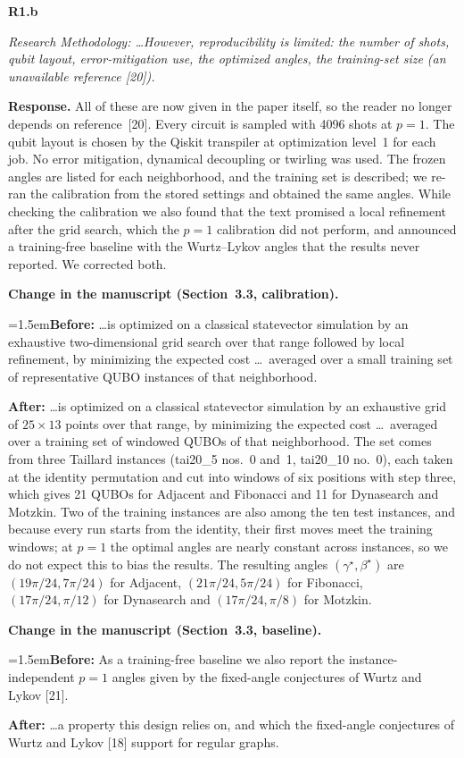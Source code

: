 \documentclass[11pt]{article}
\newenvironment{rc}[1]{\par\medskip\noindent\textbf{#1}\par\nopagebreak\noindent\itshape\ignorespaces}{\par}
\newcommand{\answer}[1]{\par\smallskip\noindent\textbf{Response.} #1\par}
\newcommand{\change}[3]{\par\smallskip\noindent\textbf{Change in the manuscript (#1).}\par
  {\leftskip=1.5em\noindent\textbf{Before:} #2\par\noindent\textbf{After:} #3\par}}
\begin{document}
\begin{rc}{R1.b}
Research Methodology: \ldots However, reproducibility is limited: the number of shots, qubit layout, error-mitigation use, the optimized angles, the training-set size (an unavailable reference [20]).
\end{rc}
\answer{All of these are now given in the paper itself, so the reader no longer depends on reference~[20]. Every circuit is sampled with 4096 shots at $p=1$. The qubit layout is chosen by the Qiskit transpiler at optimization level~1 for each job. No error mitigation, dynamical decoupling or twirling was used. The frozen angles are listed for each neighborhood, and the training set is described; we re-ran the calibration from the stored settings and obtained the same angles. While checking the calibration we also found that the text promised a local refinement after the grid search, which the $p=1$ calibration did not perform, and announced a training-free baseline with the Wurtz--Lykov angles that the results never reported. We corrected both.}
\change{Section~3.3, calibration}{\ldots is optimized on a classical statevector simulation by an exhaustive two-dimensional grid search over that range followed by local refinement, by minimizing the expected cost \ldots\ averaged over a small training set of representative QUBO instances of that neighborhood.}{\ldots is optimized on a classical statevector simulation by an exhaustive grid of $25\times13$ points over that range, by minimizing the expected cost \ldots\ averaged over a training set of windowed QUBOs of that neighborhood. The set comes from three Taillard instances (tai20\_5 nos.~0 and~1, tai20\_10 no.~0), each taken at the identity permutation and cut into windows of six positions with step three, which gives 21 QUBOs for Adjacent and Fibonacci and 11 for Dynasearch and Motzkin. Two of the training instances are also among the ten test instances, and because every run starts from the identity, their first moves meet the training windows; at $p=1$ the optimal angles are nearly constant across instances, so we do not expect this to bias the results. The resulting angles $(\gamma^\star,\beta^\star)$ are $(19\pi/24,7\pi/24)$ for Adjacent, $(21\pi/24,5\pi/24)$ for Fibonacci, $(17\pi/24,\pi/12)$ for Dynasearch and $(17\pi/24,\pi/8)$ for Motzkin.}
\change{Section~3.3, baseline}{As a training-free baseline we also report the instance-independent $p=1$ angles given by the fixed-angle conjectures of Wurtz and Lykov [21].}{\ldots a property this design relies on, and which the fixed-angle conjectures of Wurtz and Lykov [18] support for regular graphs.}
\end{document}
